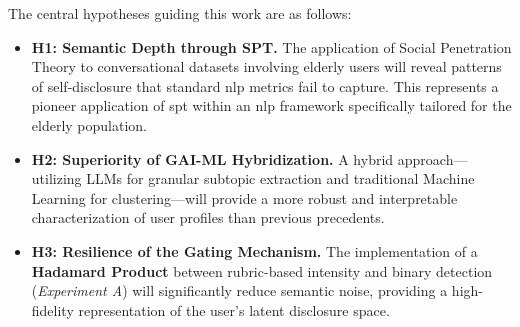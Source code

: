 The central hypotheses guiding this work are as follows:

\begin{itemize}
    \item \textbf{H1: Semantic Depth through SPT.} The application of Social Penetration Theory to conversational datasets involving elderly users will reveal patterns of self-disclosure that standard nlp metrics fail to capture. This represents a pioneer application of spt within an nlp framework specifically tailored for the elderly population.
    
    \item \textbf{H2: Superiority of GAI-ML Hybridization.} A hybrid approach---utilizing LLMs for granular subtopic extraction and traditional Machine Learning for clustering---will provide a more robust and interpretable characterization of user profiles than previous precedents.
    
    \item \textbf{H3: Resilience of the Gating Mechanism.} The implementation of a \textbf{Hadamard Product} between rubric-based intensity and binary detection (\textit{Experiment A}) will significantly reduce semantic noise, providing a high-fidelity representation of the user's latent disclosure space.
\end{itemize}
